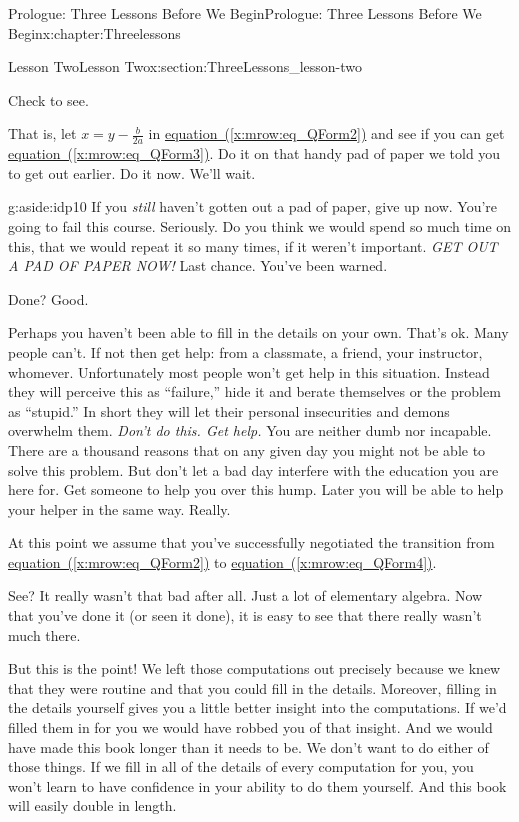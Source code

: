 \begin{chapterptx}{Prologue: Three Lessons Before We Begin}{}{Prologue: Three Lessons Before We Begin}{}{}{x:chapter:Threelessons}
\begin{sectionptx}{Lesson Two}{}{Lesson Two}{}{}{x:section:ThreeLessons_lesson-two}
		\par
		Check to see.%
		\par
		That is, let \(x=y-\frac{b}{2a}\) in \hyperref[x:mrow:eq_QForm2]{equation~({\xreffont\ref{x:mrow:eq_QForm2}})} and see if you can get \hyperref[x:mrow:eq_QForm3]{equation~({\xreffont\ref{x:mrow:eq_QForm3}})}. Do it on that handy pad of paper we told you to get out earlier. Do it now. We'll wait.%
		\begin{aside}{}{g:aside:idp10}%
			If you \emph{still} haven't gotten out a pad of paper, give up now. You're going to fail this course. Seriously. Do you think we would spend so much time on this, that we would repeat it so many times, if it weren't important. \emph{\emph{GET OUT A PAD OF PAPER NOW!}} Last chance. You've been warned.%
		\end{aside}
		Done? Good.%
		\par
		Perhaps you haven't been able to fill in the details on your own. That's ok. Many people can't. If not then get help: from a classmate, a friend, your instructor, whomever. Unfortunately most people won't get help in this situation. Instead they will perceive this as ``failure,'' hide it and berate themselves or the problem as ``stupid.'' In short they will let their personal insecurities and demons overwhelm them. \emph{Don't do this. Get help.} You are neither dumb nor incapable. There are a thousand reasons that on any given day you might not be able to solve this problem. But don't let a bad day interfere with the education you are here for. Get someone to help you over this hump. Later you will be able to help your helper in the same way. Really.%
		\par
		At this point we assume that you've successfully negotiated the transition from \hyperref[x:mrow:eq_QForm2]{equation~({\xreffont\ref{x:mrow:eq_QForm2}})} to \hyperref[x:mrow:eq_QForm4]{equation~({\xreffont\ref{x:mrow:eq_QForm4}})}.%
		\par
		See? It really wasn't that bad after all. Just a lot of elementary algebra. Now that you've done it (or seen it done), it is easy to see that there really wasn't much there.%
		\par
		But this is the point! We left those computations out precisely because we knew that they were routine and that you could fill in the details. Moreover, filling in the details yourself gives you a little better insight into the computations. If we'd filled them in for you we would have robbed you of that insight. And we would have made this book longer than it needs to be. We don't want to do either of those things. If we fill in all of the details of every computation for you, you won't learn to have confidence in your ability to do them yourself. And this book will easily double in length.%

\end{sectionptx}
\end{chapterptx}
